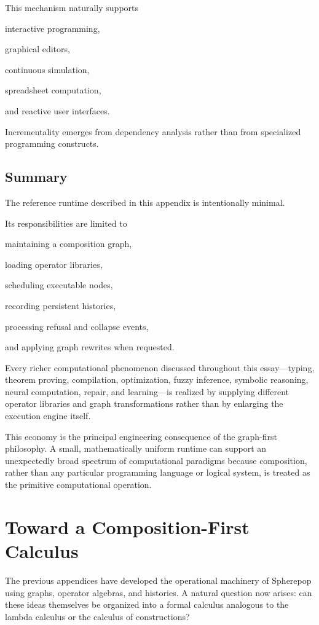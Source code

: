 \documentclass[12pt,oneside]{article}
\begin{document}
This mechanism naturally supports

interactive programming,

graphical editors,

continuous simulation,

spreadsheet computation,

and reactive user interfaces.

Incrementality emerges from dependency analysis rather than from specialized programming constructs.

\subsection{Summary}

The reference runtime described in this appendix is intentionally minimal.

Its responsibilities are limited to

maintaining a composition graph,

loading operator libraries,

scheduling executable nodes,

recording persistent histories,

processing refusal and collapse events,

and applying graph rewrites when requested.

Every richer computational phenomenon discussed throughout this essay—typing, theorem proving, compilation, optimization, fuzzy inference, symbolic reasoning, neural computation, repair, and learning—is realized by supplying different operator libraries and graph transformations rather than by enlarging the execution engine itself.

This economy is the principal engineering consequence of the graph-first philosophy. A small, mathematically uniform runtime can support an unexpectedly broad spectrum of computational paradigms because composition, rather than any particular programming language or logical system, is treated as the primitive computational operation.

\section{Toward a Composition-First Calculus}

The previous appendices have developed the operational machinery of Spherepop using graphs, operator algebras, and histories. A natural question now arises: can these ideas themselves be organized into a formal calculus analogous to the lambda calculus or the calculus of constructions?
\end{document}
